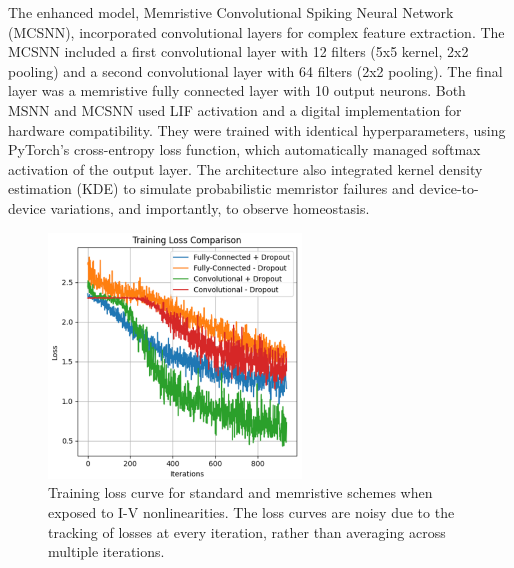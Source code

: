 
\noindent The enhanced model, Memristive Convolutional Spiking Neural Network (MCSNN), incorporated convolutional layers for complex feature extraction. The MCSNN included a first convolutional layer with 12 filters (5x5 kernel, 2x2 pooling) and a second convolutional layer with 64 filters (2x2 pooling). The final layer was a memristive fully connected layer with 10 output neurons. Both MSNN and MCSNN used LIF activation and a digital implementation for hardware compatibility. They were trained with identical hyperparameters, using PyTorch's cross-entropy loss function, which automatically managed softmax activation of the output layer. The architecture also integrated kernel density estimation (KDE) to simulate probabilistic memristor failures and device-to-device variations, and importantly, to observe homeostasis.\\

\begin{figure}[!t]
    \centerline{\includegraphics[width=0.6\textwidth]{Chapter7/Figs/c.png}}
    \caption[Training loss curve for standard and memristive schemes when exposed to I-V nonlinearities]{Training loss curve for standard and memristive schemes when exposed to I-V nonlinearities. The loss curves are noisy due to the tracking of losses at every iteration, rather than averaging across multiple iterations.}
    \label{fig:7c}
\end{figure}

